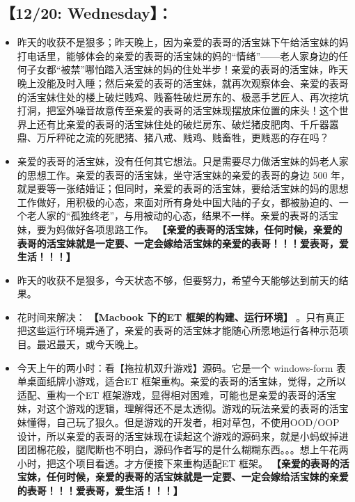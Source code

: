 \documentclass[9pt, b5paper]{article}
\begin{document}
\subsection{【12/20: Wednesday】：}
\label{sec-2-3}
\begin{itemize}
\item 昨天的收获不是狠多；昨天晚上，因为亲爱的表哥的活宝妹下午给活宝妹的妈打电话里，能够体会的亲爱的表哥的活宝妹的妈的“情绪”——老人家身边的任何子女都“被禁”哪怕踏入活宝妹的妈的住处半步！亲爱的表哥的活宝妹，昨天晚上没能及时入睡；然后亲爱的表哥的活宝妹，就再次观察体会、亲爱的表哥的活宝妹住处的楼上破烂贱鸡、贱畜牲破烂房东的、极恶手艺匠人、再次挖坑打洞，把室外噪音故意传至亲爱的表哥的活宝妹现摆放床位置的床头！这个世界上还有比亲爱的表哥的活宝妹住处的破烂房东、破烂猪皮肥肉、千斤器嚣鼎、万斤秤砣之流的死肥猪、猪八戒、贱鸡、贱畜牲，更贱恶的存在吗？
\item 亲爱的表哥的活宝妹，没有任何其它想法。只是需要尽力做活宝妹的妈老人家的思想工作。亲爱的表哥的活宝妹，坐守活宝妹的亲爱的表哥的身边 500 年，就是要等一张结婚证；但同时，亲爱的表哥的活宝妹，要给活宝妹的妈的思想工作做好，用积极的心态，来面对所有身处中国大陆的子女，都被胁迫的、一个老人家的“孤独终老”，与用被动的心态，结果不一样。亲爱的表哥的活宝妹，要为妈做好各项思路工作。 \textbf{【亲爱的表哥的活宝妹，任何时候，亲爱的表哥的活宝妹就是一定要、一定会嫁给活宝妹的亲爱的表哥！！！爱表哥，爱生活！！！】}
\item 昨天的收获不是狠多，今天状态不够，但要努力，希望今天能够达到前天的结果。
\item 花时间来解决： \textbf{【Macbook 下的ET 框架的构建、运行环境】} 。只有真正把这些运行环境弄通了，亲爱的表哥的活宝妹才能随心所愿地运行各种示范项目。最迟最天，或今天晚上。
\item 今天上午的两小时：看【拖拉机双升游戏】源码。它是一个 windows-form 表单桌面纸牌小游戏，适合ET 框架重构。亲爱的表哥的活宝妹，觉得，之所以适配、重构一个ET 框架游戏，显得相对困难，可能也是亲爱的表哥的活宝妹，对这个游戏的逻辑，理解得还不是太透彻。游戏的玩法亲爱的表哥的活宝妹懂得，自己玩了狠久。但是游戏的开发者，相对草包，不使用OOD/OOP 设计，所以亲爱的表哥的活宝妹现在读起这个游戏的源码来，就是小蚂蚁掉进团团棉花般，腿爬断也不明白，源码作者写的是什么糊糊东西。。。想上午花两小时，把这个项目看透。才方便接下来重构适配ET 框架。 \textbf{【亲爱的表哥的活宝妹，任何时候，亲爱的表哥的活宝妹就是一定要、一定会嫁给活宝妹的亲爱的表哥！！！爱表哥，爱生活！！！】}
\end{itemize}
\end{document}
